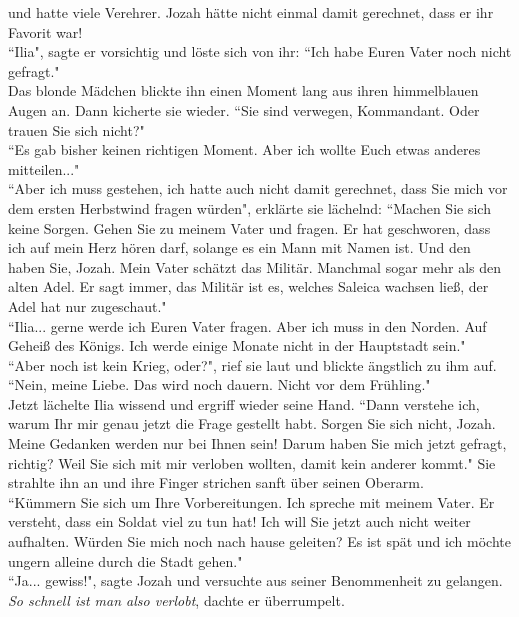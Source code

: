 und hatte viele Verehrer. Jozah hätte nicht einmal damit gerechnet, dass er ihr Favorit war!\\
 ``Ilia", sagte er vorsichtig und löste sich von ihr:  ``Ich habe Euren Vater noch nicht gefragt."\\
Das blonde Mädchen blickte ihn einen Moment lang aus ihren himmelblauen Augen an. Dann kicherte sie 
wieder.  ``Sie sind verwegen, Kommandant. Oder trauen Sie sich nicht?"\\
 ``Es gab bisher keinen richtigen Moment. Aber ich wollte Euch etwas anderes mitteilen..."\\
 ``Aber ich muss gestehen, ich hatte auch nicht damit gerechnet, dass Sie mich vor dem ersten 
Herbstwind fragen würden", erklärte sie lächelnd:  ``Machen Sie sich keine Sorgen. Gehen Sie zu 
meinem Vater und fragen. Er hat geschworen, dass ich auf mein Herz hören darf, solange es ein Mann 
mit Namen ist. Und den haben Sie, Jozah. Mein Vater schätzt das Militär. Manchmal sogar mehr als 
den alten Adel. Er sagt immer, das Militär ist es, welches Saleica wachsen ließ, der Adel hat nur 
zugeschaut."\\
 ``Ilia... gerne werde ich Euren Vater fragen. Aber ich muss in den Norden. Auf Geheiß des Königs. 
Ich werde einige Monate nicht in der Hauptstadt sein."\\
 ``Aber noch ist kein Krieg, oder?", rief sie laut und blickte ängstlich zu ihm auf.\\
 ``Nein, meine Liebe. Das wird noch dauern. Nicht vor dem Frühling."\\
Jetzt lächelte Ilia wissend und ergriff wieder seine Hand.  ``Dann verstehe ich, warum Ihr mir 
genau jetzt die Frage gestellt habt. Sorgen Sie sich nicht, Jozah. Meine Gedanken werden nur bei 
Ihnen sein! Darum haben Sie mich jetzt gefragt, richtig? Weil Sie sich mit mir verloben wollten, 
damit kein anderer kommt." Sie strahlte ihn an und ihre Finger strichen sanft über seinen Oberarm. 
\\ ``Kümmern Sie sich um Ihre Vorbereitungen. Ich spreche mit meinem Vater. Er versteht, dass ein 
Soldat viel zu tun hat! Ich will Sie jetzt auch nicht weiter aufhalten. Würden Sie mich noch nach 
hause geleiten? Es ist spät und ich möchte ungern alleine durch die Stadt gehen."\\
 ``Ja... gewiss!", sagte Jozah und versuchte aus seiner Benommenheit zu gelangen. \\
\textit{So schnell ist man also verlobt}, dachte er überrumpelt.\\

